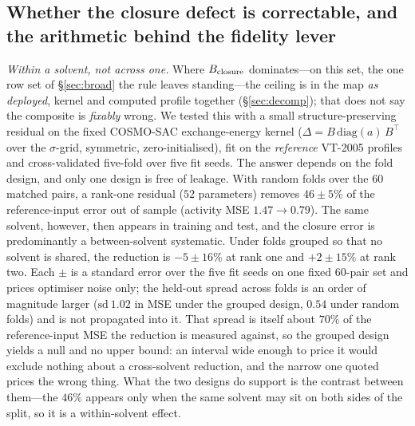 \subsection{Whether the closure defect is correctable, and the arithmetic behind the fidelity lever}
\label{sec:si-correctable}
\emph{Within a solvent, not across one.} Where
$B_{\mathrm{closure}}$ dominates---on this set, the one row set of \S\ref{sec:broad} the rule leaves
standing---the ceiling is in the map \emph{as deployed}, kernel and computed profile together
(\S\ref{sec:decomp}); that does not say the composite is \emph{fixably} wrong.
We tested this with a small structure-preserving residual on the fixed COSMO-SAC exchange-energy
kernel ($\Delta=B\,\mathrm{diag}(a)\,B^{\!\top}$ over the $\sigma$-grid, symmetric,
zero-initialised), fit on the \emph{reference} VT-2005 profiles and cross-validated five-fold over
five fit seeds. The answer depends on the fold design, and only one design is free of leakage.
With random folds over the $60$ matched pairs, a rank-one residual ($52$ parameters) removes
$46\pm5\%$ of the reference-input error out of sample (activity MSE $1.47\!\to\!0.79$). The same
solvent, however, then appears in training and test, and the closure error is predominantly a
between-solvent systematic. Under folds grouped so that no solvent is shared, the reduction is
$-5\pm16\%$ at rank one and $+2\pm15\%$ at rank two. Each $\pm$ is a standard error over the five fit
seeds on one fixed $60$-pair set and prices optimiser noise only; the held-out spread across folds is
an order of magnitude larger ($\mathrm{sd}\ 1.02$ in MSE under the grouped design, $0.54$ under random
folds) and is not propagated into it. That spread is itself about $70\%$ of the reference-input MSE
the reduction is measured against, so the grouped design yields a null and no upper bound: an
interval wide enough to price it would exclude nothing about a cross-solvent reduction, and the
narrow one quoted prices the wrong thing. What the two designs do support is the contrast between
them---the $46\%$ appears only when the same solvent may sit on both sides of the split, so it is a
within-solvent effect.

